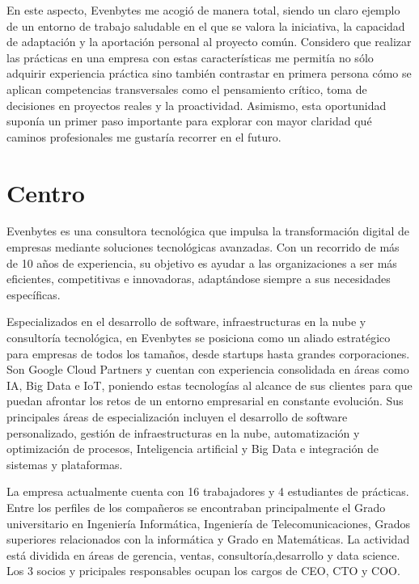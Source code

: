 En este aspecto, Evenbytes me acogió de manera total, siendo un claro ejemplo de un entorno de trabajo saludable en el que se valora la iniciativa, la capacidad de adaptación y la aportación personal al proyecto común. Considero que realizar las prácticas en una empresa con estas características me permitía no sólo adquirir experiencia práctica sino también contrastar en primera persona cómo se aplican competencias transversales como el pensamiento crítico, toma de decisiones en proyectos reales y la proactividad. Asimismo, esta oportunidad suponía un primer paso importante para explorar con mayor claridad qué caminos profesionales me gustaría recorrer en el futuro.
%
%
\section{Centro} \label{centro}
%
%
Evenbytes es una consultora tecnológica que impulsa la transformación digital de empresas mediante soluciones tecnológicas avanzadas. Con un recorrido de más de 10 años de experiencia, su objetivo es ayudar a las organizaciones a ser más eficientes, competitivas e innovadoras, adaptándose siempre a sus necesidades específicas.

Especializados en el desarrollo de software, infraestructuras en la nube y consultoría tecnológica, en Evenbytes se posiciona como un aliado estratégico para empresas de todos los tamaños, desde startups hasta grandes corporaciones. Son Google Cloud Partners y cuentan con experiencia consolidada en áreas como IA, Big Data e IoT, poniendo estas tecnologías al alcance de sus clientes para que puedan afrontar los retos de un entorno empresarial en constante evolución. Sus principales áreas de especialización incluyen el desarrollo de software personalizado, gestión de infraestructuras en la nube, automatización y optimización de procesos, Inteligencia artificial y Big Data e integración de sistemas y plataformas.

La empresa actualmente cuenta con 16 trabajadores y 4 estudiantes de prácticas. Entre los perfiles de los compañeros se encontraban principalmente el Grado universitario en Ingeniería Informática, Ingeniería de Telecomunicaciones, Grados superiores relacionados con la informática y Grado en Matemáticas. La actividad está dividida en áreas de gerencia, ventas, consultoría,desarrollo y data science. Los 3 socios y pricipales responsables ocupan los cargos de CEO, CTO y COO.

%
%
